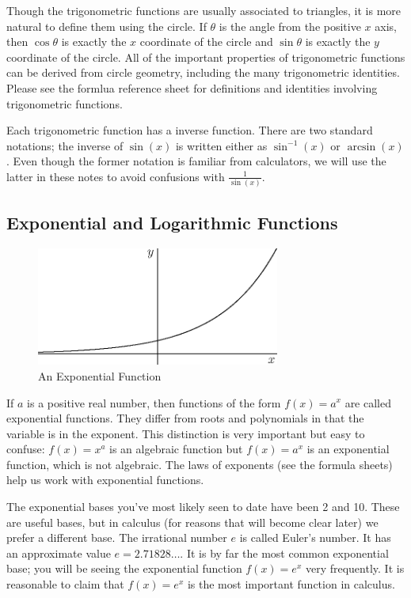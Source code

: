 \documentclass[fleqn]{report}
\begin{document}
Though the trigonometric functions are usually associated to triangles,
it is more natural to define them using the circle. If
$\theta$ is the angle from the positive $x$ axis, then $\cos
\theta$ is exactly the $x$ coordinate of the circle and $\sin
\theta$ is exactly the $y$ coordinate of the circle. All of
the important properties of trigonometric functions can be
derived from circle geometry, including the many trigonometric
identities. Please see the formlua reference sheet for
definitions and identities involving trigonometric functions.

Each trigonometric function has a inverse function. There are
two standard notations; the inverse of $\sin(x)$ is written
either as $\sin^{-1}(x)$ or $\arcsin(x)$. Even though the
former notation is familiar from calculators, we will use the
latter in these notes to avoid confusions with
$\frac{1}{\sin(x)}$.

\subsection{Exponential and Logarithmic Functions}
\label{exponential-functions}

\begin{figure}[t]
\centering
\includegraphics[width=8cm]{figure31.eps}
\caption{An Exponential Function}
\label{figure-an-exponential-function}
\end{figure}

If $a$ is a positive real number, then functions of the form
$f(x) = a^x$ are called exponential functions. They differ
from roots and polynomials in that the variable is in the
exponent. This distinction is very important but easy to
confuse: $f(x) = x^a$ is an algebraic function but $f(x) =
a^x$ is an exponential function, which is not algebraic.
The laws of exponents (see the formula sheets) help us work
with exponential functions.

The exponential bases you've most likely seen to
date have been 2 and 10. These are useful bases, but in
calculus (for reasons that will become clear later) we prefer
a different base. The irrational number $e$ is called Euler's
number. It has an approximate
value $e = 2.71828\ldots$. It is by far the most common
exponential base; you will be seeing the exponential function
$f(x) = e^x$ very frequently. It is reasonable to claim that 
$f(x) = e^x$ is the most important function in calculus.
\end{document}
